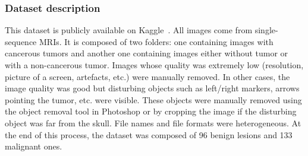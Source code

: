 \subsubsection{Dataset description}
\setlength{\marginparwidth}{3cm}\leavevmode {}This dataset is publicly available on Kaggle~\cite{51}. All images come from single-sequence MRIs. It is composed of two folders: one containing images with cancerous tumors and another one containing images either without tumor or with a non-cancerous tumor. Images whose quality was extremely low (resolution, picture of a screen, artefacts, etc.) were manually removed. In other cases, the image quality was good but disturbing objects such as left/right markers, arrows pointing the tumor, etc. were visible. These objects were manually removed using the object removal tool in Photoshop or by cropping the image if the disturbing object was far from the skull. File names and file formats were heterogeneous. At the end of this process, the dataset was composed of 96 benign lesions and 133 malignant ones.


